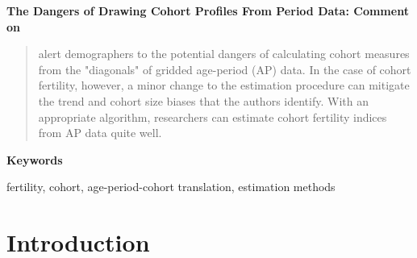 \documentclass[12pt,letterpaper]{article}
\begin{document}
\doublespacing

\newcommand{\absdiv}[1]{%
 \par\addvspace{.5\baselineskip} 
  \noindent\textbf{#1} \\}

\begin{titlepage}
   \begin{center}
       \vspace*{8cm}

       \LARGE \textbf{The Dangers of Drawing Cohort Profiles From Period Data: Comment on  \citeauthor{van_raalte_dangers_2023}}
      \vspace*{3cm}
      \vfill
   \end{center}
\end{titlepage}

\clearpage

\begin{abstract}

\cite{van_raalte_dangers_2023} alert demographers to the potential dangers of calculating cohort measures from the "diagonals" of gridded age-period (AP) data. In the case of cohort fertility, however, a minor change to the estimation procedure can mitigate the trend and cohort size biases that the authors identify. With an appropriate algorithm, researchers can estimate cohort fertility indices from AP data quite well. 

\end{abstract}

\textbf{Keywords}

fertility, cohort, age-period-cohort translation, estimation methods

\clearpage


\section{Introduction}
\end{document}

